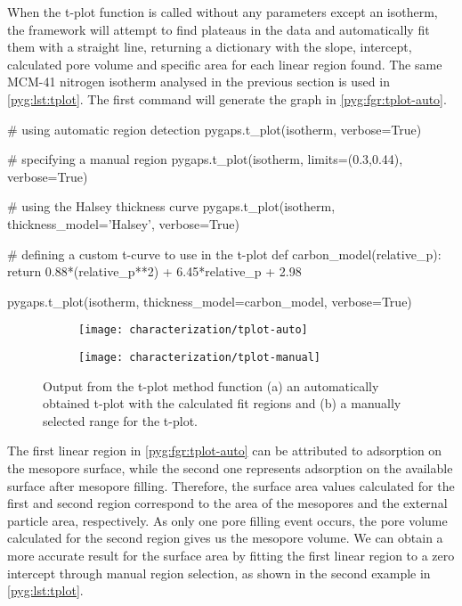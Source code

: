 When the t-plot function is called without any parameters
except an isotherm, the framework will attempt to find 
plateaus in the data and
automatically fit them with a straight line, returning a dictionary
with the slope, intercept, calculated pore volume and specific area
for each linear region found. 
The same MCM-41 nitrogen isotherm analysed in the previous section is
used in \autoref{pyg:lst:tplot}. The first command will generate the
graph in \autoref{pyg:fgr:tplot-auto}. 

\begin{python}[float=htb, caption={Generating a t-plot},%
    label={pyg:lst:tplot}]
# using automatic region detection
pygaps.t_plot(isotherm, verbose=True)

# specifying a manual region
pygaps.t_plot(isotherm, limits=(0.3,0.44), verbose=True)

# using the Halsey thickness curve
pygaps.t_plot(isotherm, thickness_model='Halsey', verbose=True)

# defining a custom t-curve to use in the t-plot
def carbon_model(relative_p):
	return 0.88*(relative_p**2) + 6.45*relative_p + 2.98

pygaps.t_plot(isotherm, thickness_model=carbon_model, verbose=True)
\end{python}

\begin{figure}[!htb]
	\centering

	\begin{subfigure}{0.45\linewidth}
		\parbox[c]{0.1\linewidth}{\caption{}%
			\label{pyg:fgr:tplot-auto}}
		\parbox[b]{0.85\linewidth}{%
			\texttt{[image: characterization/tplot-auto]}}
	\end{subfigure}%
	\begin{subfigure}{0.45\linewidth}
		\parbox[c]{0.1\linewidth}{\caption{}%
			\label{pyg:fgr:tplot-manual}}
		\parbox[b]{0.85\linewidth}{%
			\texttt{[image: characterization/tplot-manual]}}
	\end{subfigure}%

	\caption{Output from the t-plot method function (a) an automatically
		obtained t-plot with the calculated fit regions and (b) a manually
		selected range for the t-plot.}%
	\label{pyg:fgr:tplot}

\end{figure}

The first linear region in \autoref{pyg:fgr:tplot-auto} can be attributed
to adsorption on the mesopore surface,
while the second one represents adsorption on the available surface
after mesopore filling. Therefore, the surface area values calculated 
for the first and second region correspond to the area of the mesopores
and the external particle area, respectively. As only one pore filling 
event occurs, the pore volume calculated for the second region gives
us the mesopore volume. We can obtain a more accurate result for the
surface area by fitting the first linear region to a zero intercept
through manual region selection, as shown in the second example in 
\autoref{pyg:lst:tplot}.

